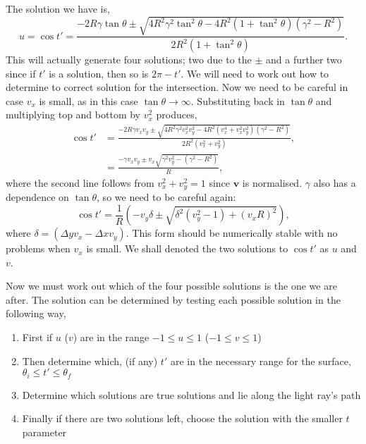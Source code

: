 \documentclass{article}
\let\vec \bm
\begin{document}
The solution we have is,
\begin{equation}
    u = \cos t'
    =
    \frac{-2R\gamma \tan \theta 
    \pm
    \sqrt{
    4R^2 \gamma^2 \tan^2 \theta
    -
    4
    R^2 \left( 1 + \tan^2 \theta \right)
    \left(
        \gamma^2 - R^2
    \right)
    }}{2R^2 \left( 1 + \tan^2 \theta \right)}.
\end{equation}
This will actually generate four solutions; two due to the $\pm$ and a further two since if $t'$ is a solution, then so is $2\pi - t'$. We will need to work out how to determine to correct solution for the intersection. Now we need to be careful in case $v_x$ is small, as in this case $\tan \theta \rightarrow \infty$. Substituting back in $\tan \theta$ and multiplying top and bottom by $v_x^2$ produces,
\begin{align}
    \cos t'
    &=
    \frac{-2R\gamma v_x v_y
    \pm
    \sqrt{
    4R^2 \gamma^2 v_x^2 v_y^2
    -
    4
    R^2 \left( v_x^4 + v_x^2 v_y^2 \right)
    \left(
        \gamma^2 - R^2
    \right)
    }}{2R^2 \left( v_x^2 + v_y^2 \right)}, \\
    &=
    \frac{-\gamma v_x v_y
    \pm
    v_x
    \sqrt{
     \gamma^2 v_y^2
    -
    \left(
        \gamma^2 - R^2
    \right)
    }}{R},
\end{align}
where the second line follows from $v_x^2 + v_y^2 = 1$ since $\vec{v}$ is normalised. $\gamma$ also has a dependence on $\tan \theta$, so we need to be careful again:
\begin{equation}
    \cos t'
    =
    \frac{1}{R}
    \left(
        -v_y
        \delta
        \pm
        \sqrt{
         \delta^2 
        \left(
            v_y^2 - 1
        \right)
        +
        \left(
            v_x R
        \right)^2
        }
    \right),
\end{equation}
where $\delta = \left( \Delta y v_x - \Delta x v_y \right)$. This form should be numerically stable with no problems when $v_x$ is small. We shall denoted the two solutions to $\cos t'$ as $u$ and $v$.

Now we must work out which of the four possible solutions is the one we are after. The solution can be determined by testing each possible solution in the following way,
\begin{enumerate}
    \item First if $u$ ($v$) are in the range $-1 \le u \le 1$ ($-1 \le v \le 1$)
    \item Then determine which, (if any) $t'$ are in the necessary range for the surface, $\theta_i \le t' \le \theta_f$
    \item Determine which solutions are true solutions and lie along the light ray's path
    \item Finally if there are two solutions left, choose the solution with the smaller $t$ parameter
\end{enumerate}
\end{document}
